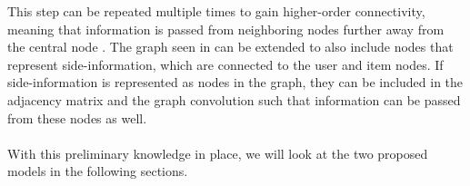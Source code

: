 This step can be repeated multiple times to gain higher-order connectivity, meaning that information is passed from neighboring nodes further away from the central node \cite{SimplifyingGCN, KOrderConnectivity}.
The graph seen in  can be extended to also include nodes that represent side-information, which are connected to the user and item nodes.
If side-information is represented as nodes in the graph, they can be included in the adjacency matrix and the graph convolution such that information can be passed from these nodes as well.\\\\
With this preliminary knowledge in place, we will look at the two proposed models in the following sections.
